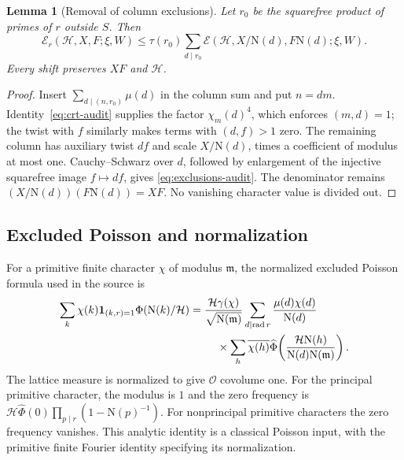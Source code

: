 \documentclass[11pt]{article}
\numberwithin{equation}{section}
\newtheorem{lemma}[theorem]{Lemma}
\theoremstyle{definition}
\theoremstyle{remark}
\newcommand{\OO}{\mathcal O}
\newcommand{\E}{\mathcal E}
\newcommand{\N}{\mathrm N}
\newcommand{\ind}{\mathbf 1}
\begin{document}
\begin{lemma}[Removal of column exclusions]\label{lem:exclusions}
Let \(r_0\) be the squarefree product of primes of \(r\) outside
\(S\). Then
\begin{equation}\label{eq:exclusions-audit}
 \E_r(\mathcal H,X,F;\xi,W)
 \le\tau(r_0)\sum_{d\mid r_0}
       \E(\mathcal H,X/\N(d),F\N(d);\xi,W).
\end{equation}
Every shift preserves \(XF\) and \(\mathcal H\).
\end{lemma}
\begin{proof}
Insert \(\sum_{d\mid(n,r_0)}\mu(d)\) in the column sum and put
\(n=dm\). Identity~\eqref{eq:crt-audit} supplies the factor
\(\chi_m(d)^4\), which enforces \((m,d)=1\); the twist with
\(f\) similarly makes terms with \((d,f)>1\) zero.
The remaining column has auxiliary twist \(df\) and scale
\(X/\N(d)\), times a coefficient of modulus at most one.
Cauchy--Schwarz over \(d\), followed by enlargement of the injective
squarefree image \(f\mapsto df\), gives \eqref{eq:exclusions-audit}.
The denominator remains
\((X/\N(d))(F\N(d))=XF\). No vanishing character value is divided out.
\end{proof}

\subsection{Excluded Poisson and normalization}

For a primitive finite character \(\chi\) of modulus \(\mathfrak m\),
the normalized excluded Poisson formula used in the source is
\begin{equation}\label{eq:poisson-audit}
\begin{split}
 \sum_k\chi(k)\ind_{(k,r)=1}\Phi(\N(k)/\mathcal H)
 ={}&\frac{\mathcal H\gamma(\chi)}{\sqrt{\N(\mathfrak m)}}
 \sum_{d\mid\operatorname{rad}r}\frac{\mu(d)\chi(d)}{\N(d)}\\
 &\hspace{4mm}\times\sum_h\overline{\chi(h)}
  \widehat\Phi\!\left(\frac{\mathcal H\N(h)}
                           {\N(d)\N(\mathfrak m)}\right).
\end{split}
\end{equation}
The lattice measure is normalized to give \(\OO\) covolume one.
For the principal primitive character, the modulus is \(1\) and
the zero frequency is
\(\mathcal H\widehat\Phi(0)\prod_{p\mid r}(1-\N(p)^{-1})\).
For nonprincipal primitive characters the zero frequency vanishes.
This analytic identity is a classical Poisson input, with the
primitive finite Fourier identity specifying its normalization.
\end{document}
